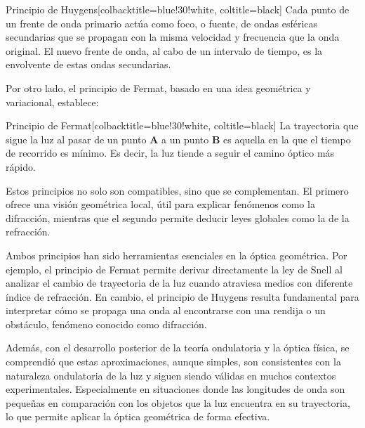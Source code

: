 \begin{mybox}[green]{Principio de Huygens}[colbacktitle=blue!30!white, coltitle=black]
	Cada punto de un frente de onda primario actúa como foco, o fuente, de ondas esféricas secundarias que se propagan con la misma velocidad y frecuencia que la onda original. El nuevo frente de onda, al cabo de un intervalo de tiempo, es la envolvente de estas ondas secundarias.
\end{mybox}

Por otro lado, el principio de Fermat, basado en una idea geométrica y variacional, establece:

\begin{mybox}[green]{Principio de Fermat}[colbacktitle=blue!30!white, coltitle=black]
	La trayectoria que sigue la luz al pasar de un punto \textbf{A} a un punto \textbf{B} es aquella en la que el tiempo de recorrido es mínimo. Es decir, la luz tiende a seguir el camino óptico más rápido.
\end{mybox}

\vspace{0.3cm}

Estos principios no solo son compatibles, sino que se complementan. El primero ofrece una visión geométrica local, útil para explicar fenómenos como la difracción, mientras que el segundo permite deducir leyes globales como la de la refracción.

Ambos principios han sido herramientas esenciales en la óptica geométrica. Por ejemplo, el principio de Fermat permite derivar directamente la ley de Snell al analizar el cambio de trayectoria de la luz cuando atraviesa medios con diferente índice de refracción. En cambio, el principio de Huygens resulta fundamental para interpretar cómo se propaga una onda al encontrarse con una rendija o un obstáculo, fenómeno conocido como difracción.

Además, con el desarrollo posterior de la teoría ondulatoria y la óptica física, se comprendió que estas aproximaciones, aunque simples, son consistentes con la naturaleza ondulatoria de la luz y siguen siendo válidas en muchos contextos experimentales. Especialmente en situaciones donde las longitudes de onda son pequeñas en comparación con los objetos que la luz encuentra en su trayectoria, lo que permite aplicar la óptica geométrica de forma efectiva.

\vspace{0.3cm}

